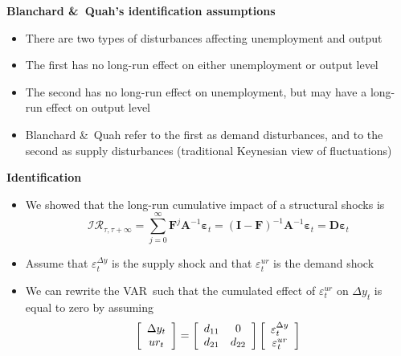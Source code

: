 \documentclass[10pt,handout]{beamer}
\begin{document}
\vspace{.1cm}

\begin{frame}
{\textbf{Blanchard \&\ Quah's identification assumptions}}

\begin{itemize}
\item There are two types of disturbances affecting unemployment and
output\medskip \pause

\item The first has no long-run effect on either unemployment or output
level\medskip \pause

\item The second has no long-run effect on unemployment, but {{\color{red}
may have a long-run effect on output level}}\medskip \pause

\item Blanchard \&\ Quah refer to the first as demand disturbances, and to
the second as supply disturbances (traditional Keynesian view of
fluctuations)
\end{itemize}
\end{frame}

\vspace{.1cm}

\begin{frame}
{\textbf{Identification}}

\begin{itemize}
\item We showed that the long-run cumulative impact of a structural shocks
is 
\begin{equation*}
\mathcal{IR}_{\tau ,\tau +\infty }=\sum\limits_{j=0}^{\infty }\mathbf{F}^{j}%
\mathbf{A}^{-1}\mathbf{\varepsilon }_{t}=\left( \mathbf{I}-\mathbf{F}\right)
^{-1}\mathbf{A}^{-1}\mathbf{\varepsilon }_{t}=\mathbf{D\varepsilon }_{t}
\end{equation*}%
\pause

\item Assume that $\varepsilon _{t}^{\Delta y}$ is the supply shock and that 
$\varepsilon _{t}^{ur}$ is the demand shock\smallskip \pause

\item We can rewrite the VAR\ such that the cumulated effect of $\varepsilon
_{t}^{ur}$ on $\Delta y_{t}$ is equal to zero by assuming%
\begin{equation*}
\left[ 
\begin{array}{c}
\Delta y_{t} \\ 
ur_{t}%
\end{array}%
\right] =\left[ 
\begin{array}{cc}
d_{11} & {\color{red}}0 \\ 
d_{21} & d_{22}%
\end{array}%
\right] \left[ 
\begin{array}{c}
\varepsilon _{t}^{\Delta y} \\ 
\varepsilon _{t}^{ur}%
\end{array}%
\right] 
\end{equation*}
\end{itemize}
\end{frame}
\end{document}
